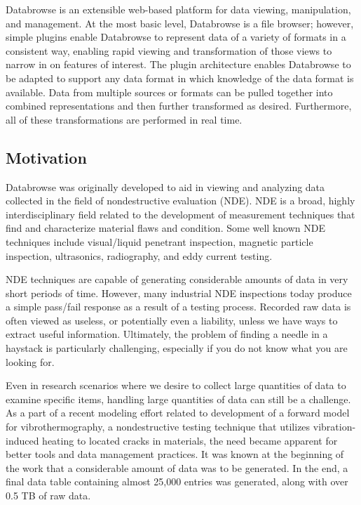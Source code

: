 \documentclass[10pt]{article}
\begin{document}
Databrowse is an extensible web-based platform for data viewing, manipulation, and management.  At the most basic level, Databrowse is a file browser; however, simple plugins enable Databrowse to represent data of a variety of formats in a consistent way, enabling rapid viewing and transformation of those views to narrow in on features of interest.  The plugin architecture enables Databrowse to be adapted to support any data format in which knowledge of the data format is available.  Data from multiple sources or formats can be pulled together into combined representations and then further transformed as desired.  Furthermore, all of these transformations are performed in real time.

\subsection{Motivation}

Databrowse was originally developed to aid in viewing and analyzing data collected in the field of nondestructive evaluation (NDE).  NDE is a broad, highly interdisciplinary field related to the development of measurement techniques that find and characterize material flaws and condition.  Some well known NDE techniques include visual/liquid penetrant inspection, magnetic particle inspection, ultrasonics, radiography, and eddy current testing.  

NDE techniques are capable of generating considerable amounts of data in very short periods of time.  However, many industrial NDE inspections today produce a simple pass/fail response as a result of a testing process.  Recorded raw data is often viewed as useless, or potentially even a liability, unless we have ways to extract useful information.  Ultimately, the problem of finding a needle in a haystack is particularly challenging, especially if you do not know what you are looking for.

Even in research scenarios where we desire to collect large quantities of data to examine specific items, handling large quantities of data can still be a challenge.  As a part of a recent modeling effort related to development of a forward model for vibrothermography, a nondestructive testing technique that utilizes vibration-induced heating to located cracks in materials, the need became apparent for better tools and data management practices.  It was known at the beginning of the work that a considerable amount of data was to be generated.  In the end, a final data table containing almost 25,000 entries was generated, along with over 0.5 TB of raw data.  
\end{document}
